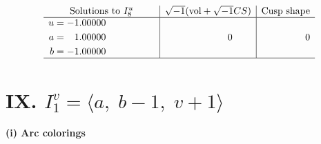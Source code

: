 \documentclass[1p]{elsarticle_modified}
\theoremstyle{definition}
\newcommand{\I}{\sqrt{-1}}
\begin{document}
$$\begin{array}{c|c|c}  
\text{Solutions to }I^u_{8}& \I (\text{vol} + \sqrt{-1}CS) & \text{Cusp shape}\\
 \hline 
\begin{aligned}
u &= -1.00000\phantom{ +0.000000I} \\
a &= \phantom{-}1.00000\phantom{ +0.000000I} \\
b &= -1.00000\phantom{ +0.000000I}\end{aligned}
 & \phantom{-0.000000 } 0 & \phantom{-0.000000 } 0\\
 \hline 
 \end{array}$$\newpage\newpage\renewcommand{\arraystretch}{1}
\centering \section*{IX. $I^v_{1}= \langle a,\;b-1,\;v+1 \rangle$}
\flushleft \textbf{(i) Arc colorings}\\
\end{document}

